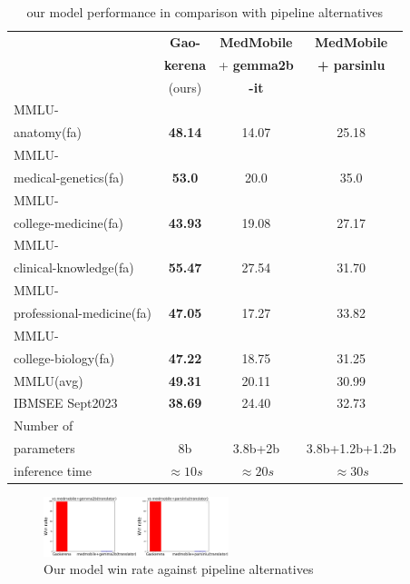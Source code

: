 \documentclass[conference]{IEEEtran}
\begin{document}
	\begin{table}[ht]
		\centering
		\caption{our model performance 
			in comparison with pipeline alternatives}
		\begin{tabular}{|l|c|c|c|}  %
			\hline
			\textbf{} & \textbf{Gao-} 
			& \textbf{MedMobile} & \textbf{MedMobile} \\ 
			& \textbf{kerena} & + \textbf{gemma2b} & \textbf{+ parsinlu} \\
			& (ours)  & \textbf{-it} &  \\ \hline
			MMLU- &  &  &  \\ 
			anatomy(fa)  & \textbf{48.14} & 14.07 & 25.18  \\ \hline
			MMLU- &    &  &  \\
			medical-genetics(fa) & \textbf{53.0} & 20.0 & 35.0 \\ \hline
			MMLU- &  &    &  \\
			college-medicine(fa) & \textbf{43.93} & 19.08 & 27.17 \\ \hline
			MMLU- &    &  &  \\
			clinical-knowledge(fa)& \textbf{55.47} & 27.54 & 31.70 \\ \hline
			MMLU- &  &  &  \\
			professional-medicine(fa)& \textbf{47.05} & 17.27 & 33.82 \\ \hline
			MMLU- &  &  &  \\
			college-biology(fa)& \textbf{47.22} & 18.75 & 31.25 \\ \hline
			MMLU(avg) & \textbf{49.31} & 20.11 & 30.99 \\ \hline
			IBMSEE Sept2023 & \textbf{38.69}  & 24.40 & 32.73  \\ \hline
			Number of&  &  &  \\
			parameters & 8b & 3.8b+2b & 3.8b+1.2b+1.2b \\ \hline
			inference time & $\approx 10s$ & $\approx 20s$ & $\approx 30s$ \\  \hline
		\end{tabular}
		\label{tab:model_results_on_mcqa_vs_pipeline_alternative}
	\end{table}
	
	\begin{figure}[htbp]
		\centerline{\includegraphics[width=0.48\textwidth]{fig4.png}}
		\caption{Our model win rate against pipeline alternatives}
		\label{fig4}
	\end{figure}
\end{document}
